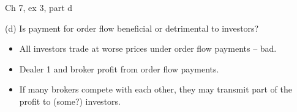 \documentclass[english,10pt
,aspectratio=169
]{beamer}
\begin{document}
\begin{frame}{Ch 7, ex 3, part d}
	\begin{exampleblock}{}
		(d) Is payment for order flow beneficial or detrimental to investors?
	\end{exampleblock}
	
	\pause 
	
	\begin{itemize}
		\item All investors trade at worse prices under order flow payments -- bad.
		
		\item Dealer 1 and broker profit from order flow payments.
		
		\item If many brokers compete with each other, they may transmit part of the profit to (some?) investors.
	\end{itemize}
\end{frame}
\end{document}
